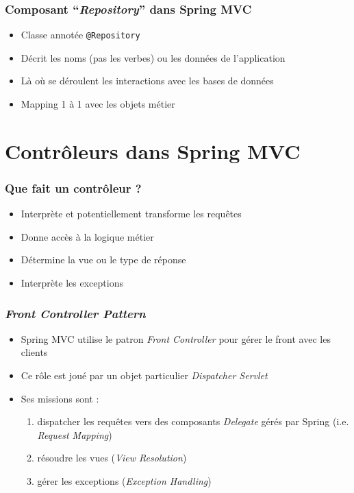 \documentclass{beamer}
\begin{document}
\begin{frame}
	\frametitle{Composant ``\textit{Repository}'' dans Spring MVC}
	\begin{itemize}
		\item Classe annotée \texttt{@Repository}
		\item Décrit les noms (pas les verbes) ou les données de l'application
		\item Là où se déroulent les interactions avec les bases de données
		\item Mapping 1 à 1 avec les objets métier
	\end{itemize}
\end{frame}

\section{Contrôleurs dans Spring MVC}

\begin{frame}
  \frametitle{Que fait un contrôleur ?}
  \begin{itemize}
  \item Interprète et potentiellement transforme les requêtes
  \item Donne accès à la logique métier
  \item Détermine la vue ou le type de réponse
  \item Interprète les exceptions
  \end{itemize}
\end{frame}

\begin{frame}
	\frametitle{\textit{Front Controller Pattern}}
	\begin{itemize}
		\item Spring MVC utilise le patron \textit{Front Controller} pour gérer le front avec les clients
		\item Ce rôle est joué par un objet particulier \textit{Dispatcher Servlet}
		\item Ses missions sont :
		\begin{enumerate}
			\item dispatcher les requêtes  vers des composants \textit{Delegate} gérés par Spring (i.e. \textit{Request Mapping})
			\item résoudre les vues (\textit{View Resolution})
			\item gérer les exceptions (\textit{Exception Handling})
		\end{enumerate}
	\end{itemize}
\end{frame}
\end{document}
